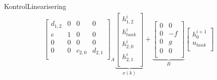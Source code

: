 \begin{frame}{Kontrol}{Linearisering}
\begin{equation}
\begin{aligned}
{\begin{bmatrix}
         d_{1,2}& 0     &0         &0 \\ %
       e    & 1     &0         &0     \\ %
          0    & 0     & 0        &0       \\ %
         0     & 0    &c_{2,0}    &  d_{2,1} \\ %
        \end{bmatrix}}_{A}
            \underbrace{\begin{bmatrix}
        h_{1,2}^{i} \\
        h_{tank}^{i}\\
        h_{2,0}^{i}\\
        h_{2,1}^{i}\\
        \end{bmatrix}}_{x(k)}
    +  \underbrace{\begin{bmatrix}
         0 & 0\\
          0& -f \\
          0& g \\ 
          0& 0 \\
        \end{bmatrix}}_{B}
        \begin{bmatrix}
        h_0^{i+1}\\
        u_{tank} \\
        \end{bmatrix}
    \end{aligned}
\end{equation}    


\end{frame}

